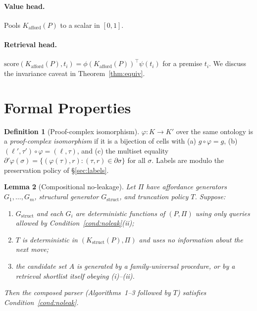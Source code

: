 \documentclass[11pt]{article}
\theoremstyle{definition}
\newtheorem{definition}{Definition}[section]
\theoremstyle{plain}
\newtheorem{lemma}[definition]{Lemma}
\newcommand{\Kstruct}{K_{\mathrm{struct}}}
\newcommand{\Kafford}{K_{\mathrm{afford}}}
\begin{document}
\paragraph{Value head.} Pools $\Kafford(P)$ to a scalar in $[0, 1]$.

\paragraph{Retrieval head.} $\mathrm{score}(\Kafford(P), t_i) = \phi(\Kafford(P))^\top \psi(t_i)$ for a premise $t_i$. We discuss the invariance caveat in Theorem~\ref{thm:equiv}.

\section{Formal Properties}\label{sec:theory}

\begin{definition}[Proof-complex isomorphism]\label{def:iso}
$\varphi\colon K \to K'$ over the same ontology is a \emph{proof-complex isomorphism} if it is a bijection of cells with (a) $g \circ \varphi = g$, (b) $(\ell', \tau') \circ \varphi = (\ell, \tau)$, and (c) the multiset equality $\partial' \varphi(\sigma) = \{(\varphi(\tau), r) : (\tau, r) \in \partial \sigma\}$ for all $\sigma$. Labels are modulo the preservation policy of \S\ref{sec:labels}.
\end{definition}

\begin{lemma}[Compositional no-leakage]\label{lem:comp-noleak}
Let $\Pi$ have affordance generators $G_1, \ldots, G_m$, structural generator $G_{\mathrm{struct}}$, and truncation policy $T$. Suppose:
\begin{enumerate}[label=(\roman*)]
\item $G_{\mathrm{struct}}$ and each $G_i$ are deterministic functions of $(P, \Pi)$ using only queries allowed by Condition~\ref{cond:noleak}(ii);
\item $T$ is deterministic in $(\Kstruct(P), \Pi)$ and uses no information about the next move;
\item the candidate set $A$ is generated by a family-universal procedure, or by a retrieval shortlist itself obeying (i)--(ii).
\end{enumerate}
Then the composed parser (Algorithms~1--3 followed by $T$) satisfies Condition~\ref{cond:noleak}.
\end{lemma}
\end{document}
